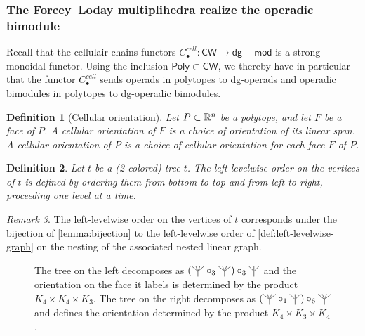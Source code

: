 \documentclass[twoside, 12pt]{amsart}
\newtheorem{definition}{Definition}[section]
\theoremstyle{remark}
\newtheorem{remark}[definition]{\sc Remark}
\begin{document}
\subsubsection{The Forcey--Loday multiplihedra realize the operadic bimodule \Minf} \label{sss:forcey--loday-realize}

Recall that the cellulair chains functors $C_\bullet^{cell} : \mathsf{CW} \rightarrow \mathsf{dg-mod}$ is a strong monoidal functor. Using the inclusion $\mathsf{Poly} \subset \mathsf{CW}$, we thereby have in particular that the functor $C_\bullet^{cell}$ sends operads in polytopes to dg-operads and operadic bimodules in polytopes to dg-operadic bimodules.

\begin{definition}[Cellular orientation] 
\leavevmode
Let $P\subset\mathbb{R}^n$ be a polytope, and let $F$ be a face of $P$. A \emph{cellular orientation of $F$} is a choice of orientation of its linear span. A \emph{cellular orientation of $P$} is a choice of cellular orientation for each face $F$ of $P$. 
\end{definition}

\begin{definition} \label{def:left-levelwise-tree}
Let $t$ be a (2-colored) tree $t$. The \emph{left-levelwise order} on the vertices of $t$ is defined by ordering them from bottom to top and from left to right, proceeding one level at a time.
\end{definition}

\begin{remark}
The left-levelwise order on the vertices of $t$ corresponds under the bijection of \cref{lemma:bijection} to the left-levelwise order of \cref{def:left-levelwise-graph} on the nesting of the associated nested linear graph.
\end{remark}

\begin{figure}
    \centering
    \begin{subfigure}{0.4\textwidth}
    \centering
    \exampleleftlevelwiseone
    \end{subfigure}
    \begin{subfigure}{0.4\textwidth}
    \centering
    \exampleleftlevelwisetwo
    \end{subfigure}
    \caption*{The tree on the left decomposes as $(\arbreopquatre \circ_3 \arbreopquatre ) \circ_3 \arbreoptrois$ and the orientation on the face it labels is determined by the product $K_4 \times K_4 \times K_3$. The tree on the right decomposes as $ (\arbreopquatre \circ_1 \arbreoptrois ) \circ_6 \arbreopquatre$ and defines the orientation determined by the product $K_4 \times K_3 \times K_4$.}
    \label{fig:left-levelwise-order}
\end{figure}
\end{document}
